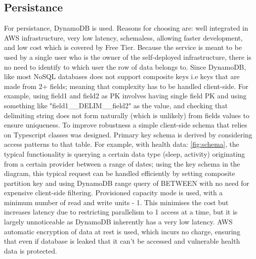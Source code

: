 \subsection{Persistance}
For persistance, DynamoDB is used. Reasons for choosing are: well integrated in AWS infrastructure, very low latency, schemaless, allowing faster development, and low cost which is covered by Free Tier. Because the service is meant to be used by a single user who is the owner of the self-deployed infrastructure, there is no need to identify to which user the row of data belongs to. Since DynamoDB, like most NoSQL databases does not support composite keys i.e keys that are made from 2+ fields; meaning that complexity has to be handled client-side. For example, using field1 and field2 as PK involves having single field PK and using something like "field1\_\_DELIM\_\_field2" as the value, and checking that delimiting string does not form naturally (which is unlikely) from fields values to ensure uniqueness. To improve robustness a simple client-side schema that relies on Typescript classes was designed. Primary key schema is derived by considering access patterns to that table. For example, with health data: \ref{fig:schema}, the typical functionality is querying a certain data type (sleep, activity) originating from a certain provider between a range of dates; using the key schema in the diagram, this typical request can be handled efficiently by setting composite partition key and using DynamoDB range query of BETWEEN with no need for expensive client-side filtering. Provisioned capacity mode is used, with a minimum number of read and write units - 1. This minimises the cost but increases latency due to restricting parallelism to 1 access at a time, but it is largely unnoticeable as DynamoDB inherently has a very low latency. AWS automatic encryption of data at rest is used, which incurs no charge, ensuring that even if database is leaked that it can't be accessed and vulnerable health data is protected.
